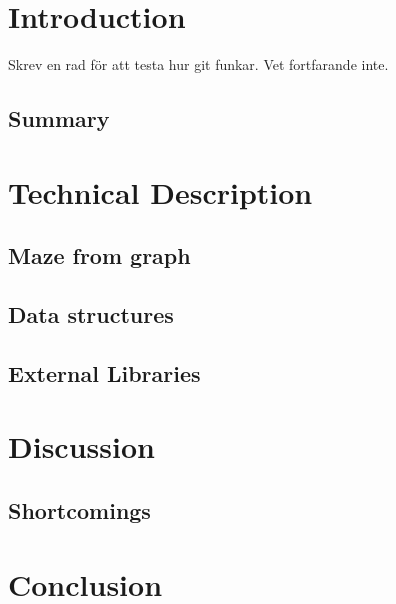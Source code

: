 \documentclass[12pt, a4paper]{article}
\begin{document}
\maketitle

\newpage


\tableofcontents


\newpage
\section{Introduction}
Skrev en rad för att testa hur git funkar. Vet fortfarande inte.
\subsection{Summary}

\newpage
\section{Technical Description}
\subsection{Maze from graph}
\subsection{Data structures}



\subsection{External Libraries}



\newpage
\section{Discussion}
\subsection{Shortcomings}



\newpage
\section{Conclusion}
\end{document}
